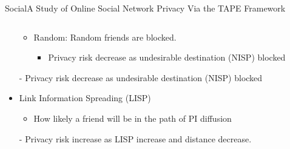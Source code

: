 \begin{frame}{Social}{A Study of Online Social Network Privacy Via the {TAPE} Framework \cite{yongbozeng_study_2015}}
\begin{columns}
\begin{column}{0.65\textwidth}
\begin{itemize}
\begin{itemize}
						\item Random: Random friends are blocked.
							\begin{itemize}
								\item Privacy risk decrease as undesirable destination (NISP) blocked
							\end{itemize}
					\end{itemize}
					
				\item[-] Privacy risk decrease as undesirable destination (NISP) blocked
					
					\bigskip
					
				\item Link Information Spreading (LISP)
					\begin{itemize}
						\item How likely a friend will be in the path of PI diffusion
					\end{itemize}
					

				\item[-] Privacy risk increase as LISP increase and distance decrease.

			\end{itemize}
			
		\end{column}
	\end{columns}
	

\end{frame}

